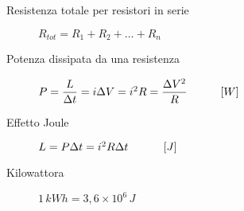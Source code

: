 \documentclass[a4paper,11pt,italian]{article}
\begin{document}
\begin{description}
  \item[Resistenza totale per resistori in serie] 
  $ R_{tot} = R_1 + R_2 + \ldots + R_n $
%

%   
  \item[Potenza dissipata da una resistenza]
  $ P = \dfrac{L}{\Delta t} = i \Delta V = i^2 R = \dfrac{\Delta V^2}{R} \hspace*{3em} [W] $
  
  \item[Effetto Joule] 
  $ L = P \Delta t = i^2 R \Delta t \hspace*{3em} \left[ J \right] $
  
  \item[Kilowattora] 
  $ 1 \, kWh = 3,6 \times 10^6 \, J $
  

\end{description}
\end{document}
